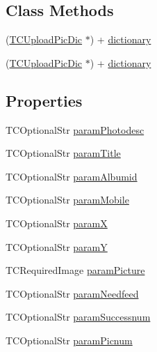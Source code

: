 \subsection*{Class Methods}
\begin{DoxyCompactItemize}
\item 
(\mbox{\hyperlink{interface_t_c_upload_pic_dic}{T\+C\+Upload\+Pic\+Dic}} $\ast$) + \mbox{\hyperlink{interface_t_c_upload_pic_dic_aaa8ccc672cb13af610eef64dfa2ae9d1}{dictionary}}
\item 
(\mbox{\hyperlink{interface_t_c_upload_pic_dic}{T\+C\+Upload\+Pic\+Dic}} $\ast$) + \mbox{\hyperlink{interface_t_c_upload_pic_dic_aaa8ccc672cb13af610eef64dfa2ae9d1}{dictionary}}
\end{DoxyCompactItemize}
\subsection*{Properties}
\begin{DoxyCompactItemize}
\item 
T\+C\+Optional\+Str \mbox{\hyperlink{interface_t_c_upload_pic_dic_af40543b89a0f024aac1c26f332704ab4}{param\+Photodesc}}
\item 
T\+C\+Optional\+Str \mbox{\hyperlink{interface_t_c_upload_pic_dic_a0bd4a218e8c37174cf031c85ee8cd664}{param\+Title}}
\item 
T\+C\+Optional\+Str \mbox{\hyperlink{interface_t_c_upload_pic_dic_a42ea7a7316c53795ac0d39b5f82c38fc}{param\+Albumid}}
\item 
T\+C\+Optional\+Str \mbox{\hyperlink{interface_t_c_upload_pic_dic_a5d8b942de0eb183b8922437ad73d8c9b}{param\+Mobile}}
\item 
T\+C\+Optional\+Str \mbox{\hyperlink{interface_t_c_upload_pic_dic_a0f89477a04d39340c7a77aa5133460bf}{paramX}}
\item 
T\+C\+Optional\+Str \mbox{\hyperlink{interface_t_c_upload_pic_dic_a603ec77f19613b735e5bb7a360858130}{paramY}}
\item 
T\+C\+Required\+Image \mbox{\hyperlink{interface_t_c_upload_pic_dic_a3b2ede9d1defb0c1c3a97c8f6c4ebec4}{param\+Picture}}
\item 
T\+C\+Optional\+Str \mbox{\hyperlink{interface_t_c_upload_pic_dic_af3f48539c91dfdc5db9103f52db7538f}{param\+Needfeed}}
\item 
T\+C\+Optional\+Str \mbox{\hyperlink{interface_t_c_upload_pic_dic_a4ba2265303e8e044e3a5068c55cd124e}{param\+Successnum}}
\item 
T\+C\+Optional\+Str \mbox{\hyperlink{interface_t_c_upload_pic_dic_a9d682b427cc6d26759b033c115354c5b}{param\+Picnum}}
\end{DoxyCompactItemize}
